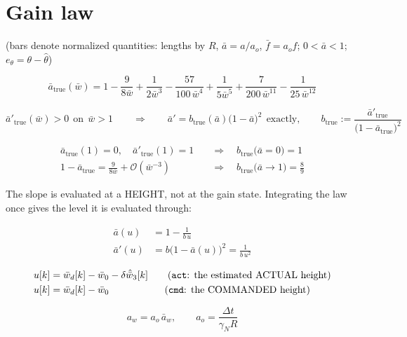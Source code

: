 \documentclass[11pt,a4paper,fontset=none]{ctexart}
\newcommand{\ba}{\bar{a}}
\newcommand{\bw}{\bar{w}}
\begin{document}
\section{Gain law}

(bars denote normalized quantities: lengths by $R$, $\ba = a/a_o$,
$\bar{f} = a_o f$; $0 < \ba < 1$; $e_{\theta} = \theta - \hat{\theta}$)

\begin{equation*}
\ba_{\mathrm{true}}(\bw) = 1 - \frac{9}{8\bw} + \frac{1}{2\bw^{3}}
  - \frac{57}{100\,\bw^{4}} + \frac{1}{5\bw^{5}}
  + \frac{7}{200\,\bw^{11}} - \frac{1}{25\,\bw^{12}}
\end{equation*}

\begin{equation*}
\ba'_{\mathrm{true}}(\bw) > 0 \ \ \text{on} \ \ \bw > 1
\qquad\Longrightarrow\qquad
\ba' = b_{\mathrm{true}}(\ba)\bigl(1-\ba\bigr)^{2}
\ \ \text{exactly},
\qquad
b_{\mathrm{true}} := \frac{\ba'_{\mathrm{true}}}
  {\bigl(1-\ba_{\mathrm{true}}\bigr)^{2}}
\end{equation*}

\begin{align*}
\ba_{\mathrm{true}}(1) = 0, \quad \ba'_{\mathrm{true}}(1) = 1
  &\quad\Longrightarrow\quad b_{\mathrm{true}}\bigl(\ba = 0\bigr) = 1 \\
1 - \ba_{\mathrm{true}} = \frac{9}{8\bw} + \mathcal{O}(\bw^{-3})
  &\quad\Longrightarrow\quad b_{\mathrm{true}}\bigl(\ba \to 1\bigr) = \frac{8}{9}
\end{align*}

The slope is evaluated at a HEIGHT, not at the gain state. Integrating the law
once gives the level it is evaluated through:

\begin{align*}
\ba(u) &= 1 - \frac{1}{b\,u} \\
\ba'(u) &= b\bigl(1-\ba(u)\bigr)^{2} = \frac{1}{b\,u^{2}}
\end{align*}

\begin{align*}
u[k] &= \bw_d[k] - \bw_0 - \delta\hat{\bw}_3[k]
  \qquad \text{(\texttt{act}: the estimated ACTUAL height)} \\
u[k] &= \bw_d[k] - \bw_0
  \qquad\qquad\quad\ \ \text{(\texttt{cmd}: the COMMANDED height)}
\end{align*}

\begin{equation*}
a_w = a_o\,\ba_w , \qquad a_o = \frac{\Delta t}{\gamma_N R}
\end{equation*}
\end{document}

